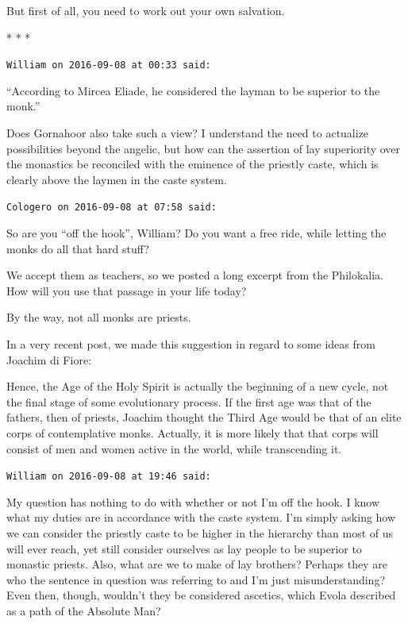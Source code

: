 But first of all, you need to work out your own salvation.




\begin{center}* * *\end{center}

\begin{footnotesize}\begin{sffamily}



\texttt{William on 2016-09-08 at 00:33 said: }

“According to Mircea Eliade, he considered the layman to be superior to the monk.”

Does Gornahoor also take such a view? I understand the need to actualize possibilities beyond the angelic, but how can the assertion of lay superiority over the monastics be reconciled with the eminence of the priestly caste, which is clearly above the laymen in the caste system.


\hfill

\texttt{Cologero on 2016-09-08 at 07:58 said: }

So are you “off the hook”, William? Do you want a free ride, while letting the monks do all that hard stuff?

We accept them as teachers, so we posted a long excerpt from the Philokalia. How will you use that passage in your life today?

By the way, not all monks are priests.

In a very recent post, we made this suggestion in regard to some ideas from Joachim di Fiore:

\begin{quotex}
Hence, the Age of the Holy Spirit is actually the beginning of a new cycle, not the final stage of some evolutionary process. If the first age was that of the fathers, then of priests, Joachim thought the Third Age would be that of an elite corps of contemplative monks. Actually, it is more likely that that corps will consist of men and women active in the world, while transcending it. 

\end{quotex}
\texttt{William on 2016-09-08 at 19:46 said: }

My question has nothing to do with whether or not I'm off the hook. I know what my duties are in accordance with the caste system. I'm simply asking how we can consider the priestly caste to be higher in the hierarchy than most of us will ever reach, yet still consider ourselves as lay people to be superior to monastic priests. Also, what are we to make of lay brothers? Perhaps they are who the sentence in question was referring to and I'm just misunderstanding? Even then, though, wouldn't they be considered ascetics, which Evola described as a path of the Absolute Man?



\end{sffamily}
\end{footnotesize}
